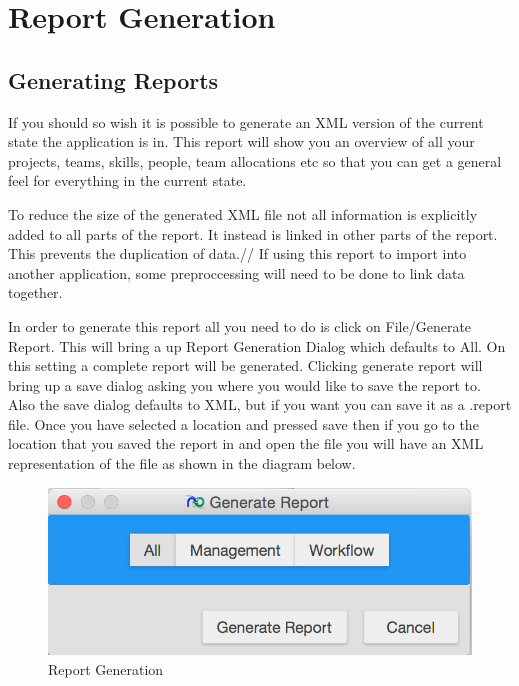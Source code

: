 \section{Report Generation}

\subsection{Generating Reports}

If you should so wish it is possible to generate an XML version of the current state the application is in. This report will show you an overview of all your projects, teams, skills, people, team allocations etc so that you can get a general feel for everything in the current state.

To reduce the size of the generated XML file not all information is explicitly added to all parts of the report. It instead is linked in other parts of the report. This prevents the duplication of data.//
If using this report to import into another application, some preproccessing will need to be done to link data together.

In order to generate this report all you need to do is click on File/Generate Report. This will bring a up Report Generation Dialog which defaults to All. On this setting a complete report will be generated. Clicking generate report will bring up a save dialog asking you where you would like to save the report to. Also the save dialog defaults to XML, but if you want you can save it as a .report file. Once you have selected a location and pressed save then if you go to the location that you saved the report in and open the file you will have an XML representation of the file as shown in the diagram below.

\begin{figure}[H]
\centering
\includegraphics[width=\textwidth]{images/screenshots/report1.PNG}
\caption{Report Generation}
\label{fig:generate_report_all}
\end{figure}

